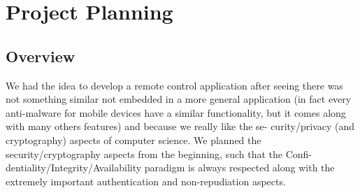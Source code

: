 \chapter{Project Planning}
\label{cap:Planning} 

\section{Overview}

We had the idea to develop a remote control application after seeing there
was not something similar not embedded in a more general application (in
fact every anti-malware for mobile devices have a similar functionality, but it
comes along with many others features) and because we really like the se-
curity/privacy (and cryptography) aspects of computer science. We planned
the security/cryptography aspects from the beginning, such that the Confi-
dentiality/Integrity/Availability paradigm is always respected along with the
extremely important authentication and non-repudiation aspects.
